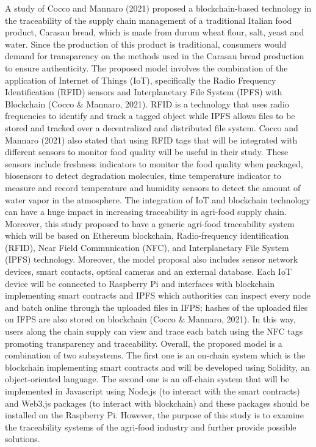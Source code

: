 A study of Cocco and Mannaro (2021) proposed a blockchain-based technology in the traceability of the supply chain management of a traditional Italian food product, Carasau bread, which is made from durum wheat flour, salt, yeast and water. Since the production of this product is traditional, consumers would demand for transparency on the methods used in the Carasau bread production to ensure authenticity. The proposed model involves the combination of the application of Internet of Things (IoT), specifically the Radio Frequency Identification (RFID) sensors and Interplanetary File System (IPFS) with Blockchain (Cocco \& Mannaro, 2021). RFID is a technology that uses radio frequencies to identify and track a tagged object while IPFS allows files to be stored and tracked over a decentralized and distributed file system. Cocco and Mannaro (2021) also stated that using RFID tags that will be integrated with different sensors to monitor food quality will be useful in their study. These sensors include freshness indicators to monitor the food quality when packaged, biosensors to detect degradation molecules, time temperature indicator to measure and record temperature and humidity sensors to detect the amount of water vapor in the atmosphere. The integration of IoT and blockchain technology can have a huge impact in increasing traceability in agri-food supply chain. Moreover, this study proposed to have a generic agri-food traceability system which will be based on Ethereum blockchain, Radio-frequency identification (RFID), Near Field Communication (NFC), and Interplanetary File System (IPFS) technology. Moreover, the model proposal also includes sensor network devices, smart contacts, optical cameras and an external database. Each IoT device will be connected to Raspberry Pi and interfaces with blockchain implementing smart contracts and IPFS which authorities can inspect every node and batch online through the uploaded files in IFPS; hashes of the uploaded files on IFPS are also stored on blockchain (Cocco \& Mannaro, 2021). In this way, users along the chain supply can view and trace each batch using the NFC tags promoting transparency and traceability. Overall, the proposed model is a combination of two subsystems. The first one is an on-chain system which is the blockchain implementing smart contracts and will be developed using Solidity, an object-oriented language. The second one is an off-chain system that will be implemented in Javascript using Node.js (to interact with the smart contracts) and Web3.js packages (to interact with blockchain) and these packages should be installed on the Raspberry Pi. However, the purpose of this study is to examine the traceability systems of the agri-food industry and further provide possible solutions. 

